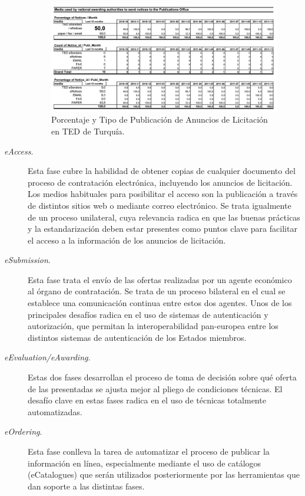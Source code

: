\begin{description}
\begin{figure}[!htb]
\centering
	\includegraphics[width=16cm]{images/phd/eproc/circa-8}
\caption{Porcentaje y Tipo de Publicación de Anuncios de Licitación en TED de Turquía.}
\label{fig:circa-8}
\end{figure}


\item [\textit{eAccess}.] Esta fase cubre la habilidad de obtener copias de cualquier documento del 
proceso de contratación electrónica, incluyendo los anuncios de licitación. Los medios habituales
para posibilitar el acceso son la publicación a través de distintos sitios web o mediante correo
electrónico. Se trata igualmente de un proceso unilateral, cuya relevancia radica
en que las buenas prácticas y la estandarización deben estar presentes como puntos clave
para facilitar el acceso a la información de los anuncios de licitación.


\item [\textit{eSubmission}.] Esta fase trata el envío de las ofertas realizadas por un agente
económico al órgano de contratación. Se trata de un proceso bilateral en el cual se establece
una comunicación continua entre estos dos agentes. Unos de los principales desafíos radica
en el uso de sistemas de autenticación y autorización, que permitan la interoperabilidad
pan-europea entre los distintos sistemas de autenticación de los Estados miembros.

\item [\textit{eEvaluation/eAwarding}.] Estas dos fases desarrollan el proceso de toma de decisión
sobre qué oferta de las presentadas se ajusta mejor al pliego de condiciones técnicas. El desafío
clave en estas fases radica en el uso de técnicas totalmente automatizadas.

\item [\textit{eOrdering}.] Esta fase conlleva la tarea de automatizar el proceso de publicar la información
en línea, especialmente mediante el uso de catálogos (eCatalogues) que serán utilizados
posteriormente por las herramientas que dan soporte a las distintas fases.


\end{description}
